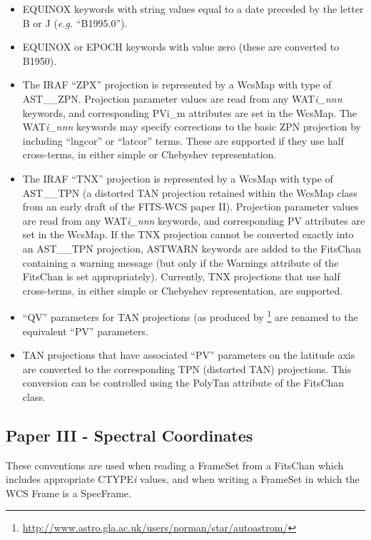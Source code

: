 \documentclass[twoside,11pt]{starlink}
\begin{document}
\begin{itemize}
\item EQUINOX keywords with string values equal to a date preceded
by the letter B or J (\emph{e.g.} ``B1995.0'').

\item EQUINOX or EPOCH keywords with value zero  (these are converted to
B1950).

\item The IRAF ``ZPX'' projection is represented by a
WcsMap with type of
AST\_\_ZPN. Projection parameter values are read from any WAT\emph{i\_nnn}
keywords, and corresponding PVi\_m attributes are set in the
WcsMap. The WAT\emph{i\_nnn} keywords may specify corrections to the basic
ZPN projection by including ``lngcor'' or ``latcor'' terms. These are
supported if they use half cross-terms, in either simple or Chebyshev
representation.

\item The IRAF ``TNX'' projection is represented by a WcsMap with type of
AST\_\_TPN (a distorted TAN projection retained within the WcsMap class
from an early draft of the FITS-WCS paper II). Projection parameter values
are read from any WAT\emph{i\_nnn} keywords, and corresponding PV
attributes are set in the WcsMap. If the TNX projection cannot be
converted exactly into an AST\_\_TPN projection, ASTWARN keywords are
added to the FitsChan containing a warning message (but only if the
Warnings attribute of the FitsChan is set appropriately). Currently,
TNX projections that use half cross-terms, in either simple or Chebyshev
representation, are supported.

\item ``QV'' parameters for TAN projections (as produced by
\footnote{\url{http://www.astro.gla.ac.uk/users/norman/star/autoastrom/}}
are renamed to the equivalent ``PV'' parameters.

\item TAN projections that have associated ``PV'' parameters on the
latitude axis are converted to the corresponding TPN (distorted TAN)
projections. This conversion can be controlled using the PolyTan attribute
of the FitsChan class.

\end{itemize}

\subsection{Paper III - Spectral Coordinates}
These conventions are used when reading a FrameSet
from a FitsChan which includes appropriate
CTYPE\emph{i} values, and when writing a FrameSet in which
the WCS Frame is a SpecFrame.
\end{document}

